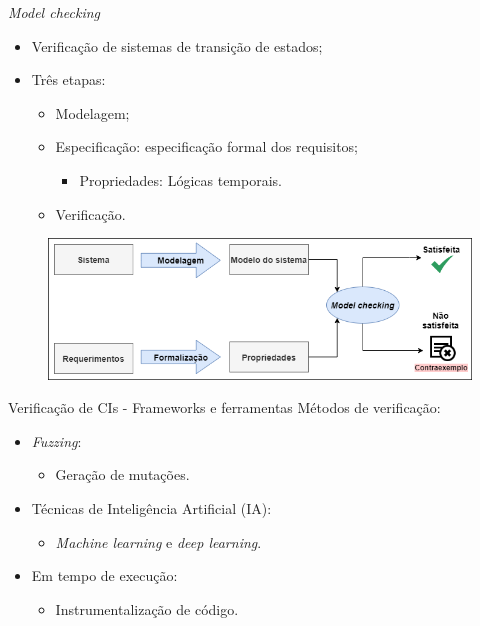 \begin{frame}{\textit{Model checking}}
	\begin{itemize}
		\item Verificação de sistemas de transição de estados;
		\item Três etapas:
		\begin{itemize}
			\item Modelagem;
			\item Especificação: especificação formal dos requisitos;
			\begin{itemize}
				\item Propriedades: Lógicas temporais.
			\end{itemize}
			\item Verificação.
		\end{itemize}
	\end{itemize}
	\begin{figure}[!htb]
		\centering
		\includegraphics[scale=0.4]{figuras/verificacao/model-checking.png}
	\end{figure}    
\end{frame}

\begin{frame}{Verificação de CIs - Frameworks e ferramentas}
	Métodos de verificação:
	\begin{itemize}		
		\item \textit{Fuzzing}:
		\begin{itemize}
			\item Geração de mutações.
		\end{itemize}
		\item Técnicas de Inteligência Artificial (IA):
		\begin{itemize}
			\item \textit{Machine learning} e \textit{deep learning}.
		\end{itemize}
		\item Em tempo de execução:
		\begin{itemize}
			\item Instrumentalização de código.
		\end{itemize}
	\end{itemize}
\end{frame}

